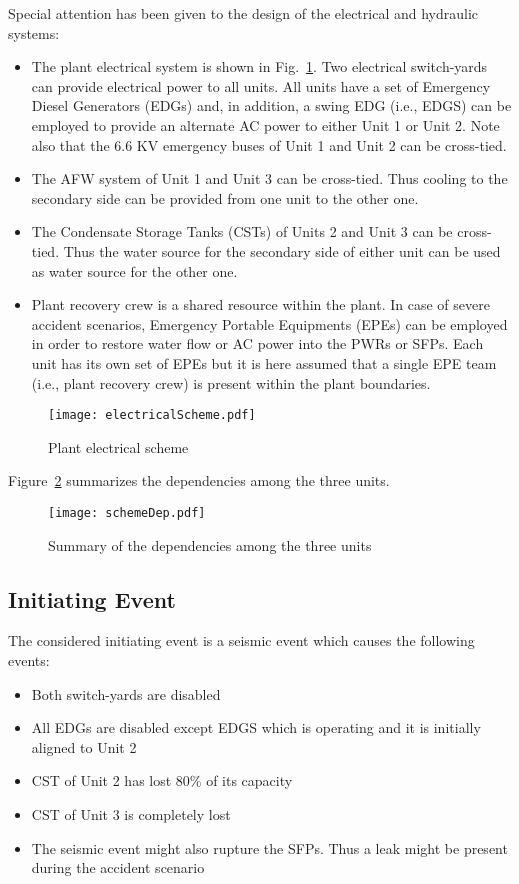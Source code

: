 Special attention has been given to the design of the electrical and hydraulic systems:
\begin{itemize}
  \item The plant electrical system is shown in Fig.~\ref{fig:electricalScheme}. Two 
        electrical switch-yards can provide electrical power to all units. All units 
        have a set of Emergency Diesel Generators (EDGs)  and, in addition, a swing 
        EDG (i.e., EDGS) can be employed to provide an alternate AC power to either
        Unit 1 or Unit 2. Note also that the 6.6 KV emergency buses of Unit 1 and 
        Unit 2 can be cross-tied.
  \item The AFW system of Unit 1 and Unit 3 can be cross-tied. 
        Thus cooling to the secondary side can be provided from one unit to the other one.
  \item The Condensate Storage Tanks (CSTs) of Units 2 and Unit 3 can be cross-tied. 
        Thus the water source  for the secondary side of either unit can be used as
        water source for the other one. 
  \item Plant recovery crew is a shared resource within the plant. In case of severe 
        accident scenarios, Emergency Portable Equipments (EPEs) can be employed in order
        to restore water flow or AC power into the PWRs or SFPs. Each unit has its own 
        set of EPEs but it is here assumed that a single EPE team (i.e., plant recovery 
        crew) is present within the plant boundaries.
\end{itemize}

\begin{figure}
    \centering
    \centerline{\texttt{[image: electricalScheme.pdf]}}
    \caption{Plant electrical scheme}
    \label{fig:electricalScheme}
\end{figure}

Figure~\ref{fig:schemeDep} summarizes the dependencies among the three units.

\begin{figure}
    \centering
    \centerline{\texttt{[image: schemeDep.pdf]}}
    \caption{Summary of the dependencies among the three units}
    \label{fig:schemeDep}
\end{figure}

\subsection{Initiating Event}

The considered initiating event is a seismic event which causes the following events:
\begin{itemize}
  \item Both switch-yards are disabled
  \item All EDGs are disabled except EDGS which is operating and it is initially aligned to Unit 2
  \item CST of Unit 2 has lost 80\% of its capacity 
  \item CST of Unit 3 is completely lost
  \item The seismic event might also rupture the SFPs. Thus a leak might be present during the accident scenario
\end{itemize}

